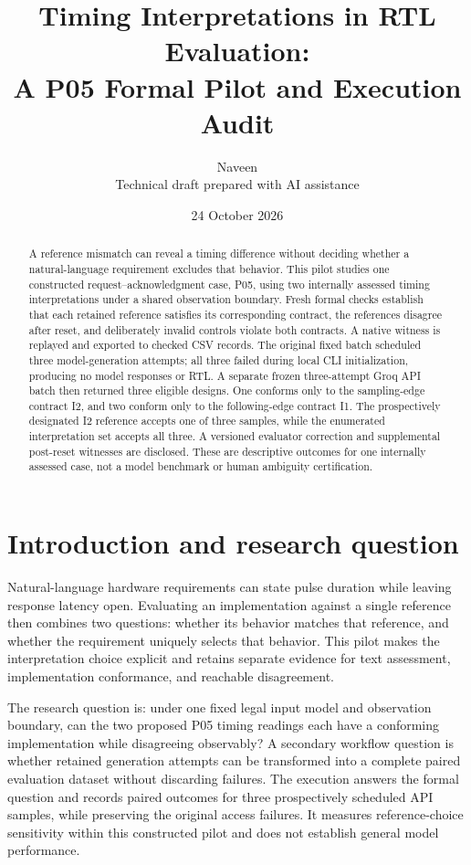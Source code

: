\documentclass[11pt,a4paper]{article}
\title{Timing Interpretations in RTL Evaluation:\\A P05 Formal Pilot and Execution Audit}
\author{Naveen\\\small Technical draft prepared with AI assistance}
\date{24 October 2026}
\begin{document}
\maketitle
\begin{abstract}
A reference mismatch can reveal a timing difference without deciding whether a natural-language requirement excludes that behavior. This pilot studies one constructed request--acknowledgment case, P05, using two internally assessed timing interpretations under a shared observation boundary. Fresh formal checks establish that each retained reference satisfies its corresponding contract, the references disagree after reset, and deliberately invalid controls violate both contracts. A native witness is replayed and exported to checked CSV records. The original fixed batch scheduled three model-generation attempts; all three failed during local CLI initialization, producing no model responses or RTL. A separate frozen three-attempt Groq API batch then returned three eligible designs. One conforms only to the sampling-edge contract I2, and two conform only to the following-edge contract I1. The prospectively designated I2 reference accepts one of three samples, while the enumerated interpretation set accepts all three. A versioned evaluator correction and supplemental post-reset witnesses are disclosed. These are descriptive outcomes for one internally assessed case, not a model benchmark or human ambiguity certification.
\end{abstract}

\section{Introduction and research question}
Natural-language hardware requirements can state pulse duration while leaving response latency open. Evaluating an implementation against a single reference then combines two questions: whether its behavior matches that reference, and whether the requirement uniquely selects that behavior. This pilot makes the interpretation choice explicit and retains separate evidence for text assessment, implementation conformance, and reachable disagreement.

The research question is: under one fixed legal input model and observation boundary, can the two proposed P05 timing readings each have a conforming implementation while disagreeing observably? A secondary workflow question is whether retained generation attempts can be transformed into a complete paired evaluation dataset without discarding failures. The execution answers the formal question and records paired outcomes for three prospectively scheduled API samples, while preserving the original access failures. It measures reference-choice sensitivity within this constructed pilot and does not establish general model performance.
\end{document}
